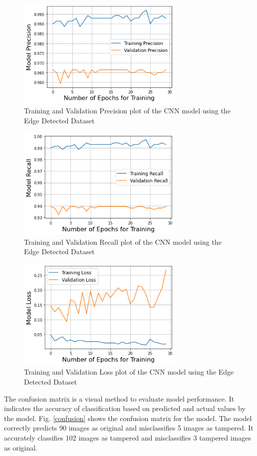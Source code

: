 \documentclass[conference]{IEEEtran}
\begin{document}
\begin{figure}[htpb]
\centerline{\includegraphics[width=8cm]{precision.png}}
\caption{Training and Validation Precision plot of the CNN model using the Edge Detected Dataset}
\label{precision}
\end{figure}


\begin{figure}[htpb]
\centerline{\includegraphics[width=8cm]{recall.png}}
\caption{Training and Validation Recall plot of the CNN model using the Edge Detected Dataset}
\label{recall}
\end{figure}

\begin{figure}[htpb]
\centerline{\includegraphics[width=8cm]{loss.png}}
\caption{Training and Validation Loss plot of the CNN model using the Edge Detected Dataset}
\label{loss}
\end{figure}

The confusion matrix is a visual method to evaluate model performance. It indicates the accuracy of classification based on predicted and actual values by the model. Fig. \ref{confusion} shows the confusion matrix for the model. The model correctly predicts 90 images as original and misclassifies 5 images as tampered. It accurately classifies 102 images as tampered and misclassifies 3 tampered images as original.
\end{document}
